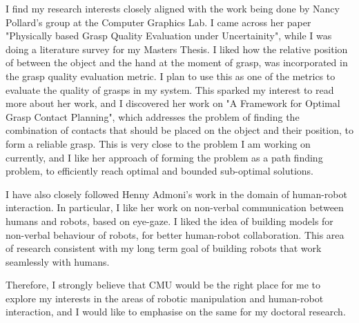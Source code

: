 \documentclass[11pt]{article}
\newcommand{\statement}[1]{\par\medskip
  \textcolor{blue}{\textbf{#1:}}\space
}
\begin{document}
\par
\justify
I find my research interests closely aligned with the work being done by Nancy Pollard's group at the Computer Graphics Lab. I came across her paper "Physically based Grasp Quality Evaluation under Uncertainity", while I was doing a literature survey for my Masters Thesis. I liked how the relative position of between the object and the hand at  the moment of grasp, was incorporated in the grasp quality evaluation metric. I plan to use this as one of the metrics to evaluate the quality of grasps in my system. This sparked my interest to read more about her work, and I discovered her work on "A Framework for Optimal Grasp Contact Planning", which addresses the problem of finding the combination of contacts that should be placed on the object and their position, to form a reliable grasp. This is very close to the problem I am working on currently, and I like her approach of forming the problem as a path finding problem, to efficiently reach optimal and bounded sub-optimal solutions.
\par
\justify
I have also closely followed Henny Admoni's work in the domain of human-robot interaction. In particular, I like her work on non-verbal communication between humans and robots, based on eye-gaze. I liked the idea of building models for non-verbal behaviour of robots, for better human-robot collaboration. This area of research consistent with my long term goal of building robots that work seamlessly with humans. 
\par
\justify
Therefore, I strongly believe that CMU would be the right place for me to explore my interests in the areas of robotic manipulation and human-robot interaction, and I would like to emphasise on the same for my doctoral research. 









%
\end{document}
